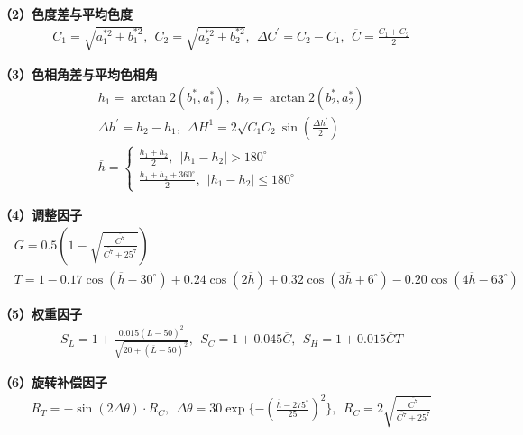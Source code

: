 \textbf{（2）色度差与平均色度}
\begin{equation}
\begin{aligned}
  &C_{1}=\sqrt{a^{*2}_{1}+b^{*2}_{1}},\ \ C_{2}=\sqrt{a^{*2}_{2}+b^{*2}_{2}},\ \ \Delta C^{'}=C_{2}-C_{1},\ \ \overline{C}=\frac{C_{1}+C_2}{2}
\end{aligned}
\end{equation}

\textbf{（3）色相角差与平均色相角}
\begin{equation}
\begin{aligned}
 &h_{1}=\arctan2(b^{*}_{1},a^{*}_{1}),\ \ h_{2}=\arctan2(b^{*}_{2},a^{*}_{2})\\
 &\Delta h^{'}=h_{2}-h_{1},\ \ \Delta H^{1}=2\sqrt{C_{1}C_{2}}\sin (\frac{\Delta h^{'}}{2})\\
 &\overline{h}=
 \begin{cases}
   \frac{h_{1}+h_{2}}{2},\ \ |h_{1}-h_{2}|>180^{\circ}\\
   \frac{h_{1}+h_{2}+360^{\circ}}{2},\ \ |h_{1}-h_{2}|\leq 180^{\circ}
 \end{cases}
\end{aligned}
\end{equation}

\textbf{（4）调整因子}
\begin{equation}
\begin{aligned}
  &G=0.5(1-\sqrt{\frac{\overline{C^{7}}}{\overline{C^{7}}+25^{7}}})\\
  &T=1-0.17\cos(\overline{h}-30^{\circ})+0.24\cos(2\overline{h})+0.32\cos(3\overline{h}+6^{\circ})-0.20\cos(4\overline{h}-63^{\circ})
\end{aligned}
\end{equation}

\textbf{（5）权重因子}
\begin{equation}
\begin{aligned}
 &S_{L}=1+\frac{0.015(L-50)^{2}}{\sqrt{20+(\overline{L}-50)^{2}}},\ \ S_{C}=1+0.045\overline{C},\ \ S_{H}=1+0.015\overline{C}T
\end{aligned}
\end{equation}

\textbf{（6）旋转补偿因子}
\begin{equation}
\begin{aligned}
 &R_{T}=-\sin(2\Delta \theta)\cdot R_{C},\ \ \Delta \theta=30\exp\{-(\frac{\overline{h}-275^{\circ}}{25})^{2}\},\ \ R_{C}=2\sqrt{\frac{\overline{C^{7}}}{\overline{C^{7}}+25^{7}}}
\end{aligned}
\end{equation}

